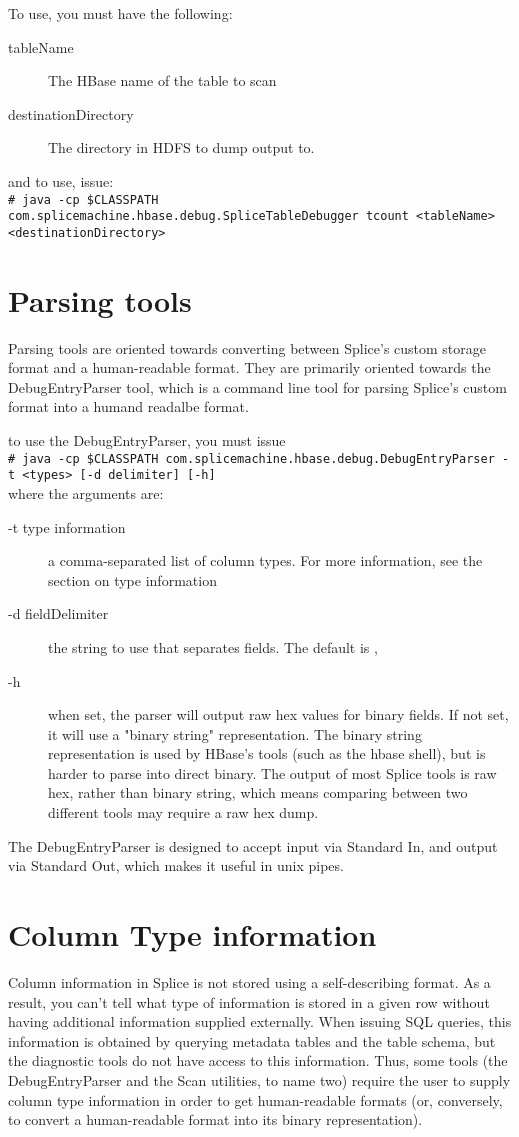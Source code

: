 \documentclass[10pt]{article}
\newcommand{\shellcmd}[1]{\\\indent\indent\texttt{\footnotesize\# #1}\\}
\begin{document}
To use, you must have the following:

\begin{description}
\item[tableName] The HBase name of the table to scan
\item[destinationDirectory] The directory in HDFS to dump output to. 
\end{description}

and to use, issue:
\shellcmd{java -cp \$CLASSPATH com.splicemachine.hbase.debug.SpliceTableDebugger tcount <tableName> <destinationDirectory>}

\section{Parsing tools}
Parsing tools are oriented towards converting between Splice's custom storage format and a human-readable format. They are primarily oriented towards
the DebugEntryParser tool, which is a command line tool for parsing Splice's custom format into a humand readalbe format.

to use the DebugEntryParser, you must issue
\shellcmd{java -cp \$CLASSPATH com.splicemachine.hbase.debug.DebugEntryParser -t <types> [-d delimiter] [-h]}

where the arguments are:

\begin{description}
\item[-t type information] a comma-separated list of column types. For more information, see the section on type information
\item[-d fieldDelimiter] the string to use that separates fields. The default is ,
\item[-h] when set, the parser will output raw hex values for binary fields. If not set, it will use a "binary string" representation. The binary string representation
is used by HBase's tools (such as the hbase shell), but is harder to parse into direct binary. The output of most Splice tools is raw hex, rather than binary string,
which means comparing between two different tools may require a raw hex dump.
\end{description}

The DebugEntryParser is designed to accept input via Standard In, and output via Standard Out, which makes it useful in unix pipes. 

\section{Column Type information}
Column information in Splice is not stored using a self-describing format. As a result, you can't tell what type of information is stored in a given row without
having additional information supplied externally. When issuing SQL queries, this information is obtained by querying metadata tables and the table schema, but
the diagnostic tools do not have access to this information. Thus, some tools (the DebugEntryParser and the Scan utilities, to name two) require the user
to supply column type information in order to get human-readable formats (or, conversely, to convert a human-readable format into its binary representation).
\end{document}
